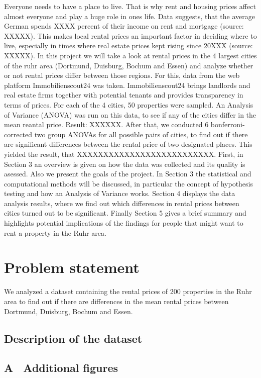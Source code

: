\documentclass[12 pt]{scrartcl}
\begin{document}
Everyone needs to have a place to live. That is why rent and housing prices affect almost everyone and play a huge role in ones life. Data suggests, that the average German spends XXXX percent of their income on rent and mortgage (source: XXXXX). This makes local rental prices an important factor in deciding where to live, especially in times where real estate prices kept rising since 20XXX (source: XXXXX).
In this project we will take a look at rental prices in the 4 largest cities of the ruhr area (Dortmund, Duisburg, Bochum and Essen) and analyze whether or not rental prices differ between those regions. For this, data from the web platform Immobilienscout24 was taken. Immobilienscout24 brings landlords and real estate firms together with potential tenants and provides transparency in terms of prices. For each of the 4 cities, 50 properties were sampled. An Analysis of Variance (ANOVA) was run on this data, to see if any of the cities differ in the mean reantal price. Result: XXXXXX.
After that, we conducted 6 bonferroni-corrected two group ANOVAs for all possible pairs of cities, to find out if there are significant differences between the rental price of two designated places. This yielded the result, that XXXXXXXXXXXXXXXXXXXXXXXXXX.
First, in Section 3 an overview is given on how the data was collected and its quality is asessed. Also we present the goals of the project. In Section 3 the statistical and computational methods will be discussed, in particular the concept of hypothesis testing and how an Analysis of Variance works.
Section 4 displays the data analysis results, where we find out which differences in rental prices between cities turned out to be significant. Finally Section 5 gives a brief summary and highlights potential implications of the findings for people that might want to rent a property in the Ruhr area.

\section{Problem statement}

We analyzed a dataset containing the rental prices of 200 properties in the Ruhr area to find out if there are differences in the mean rental prices between Dortmund, Duisburg, Bochum and Essen.

\subsection{Description of the dataset}


\newpage
{}
\renewcommand\refname{Bibliography}



\newpage
\appendix
{}
\subsection*{A \ Additional figures}
\end{document}

